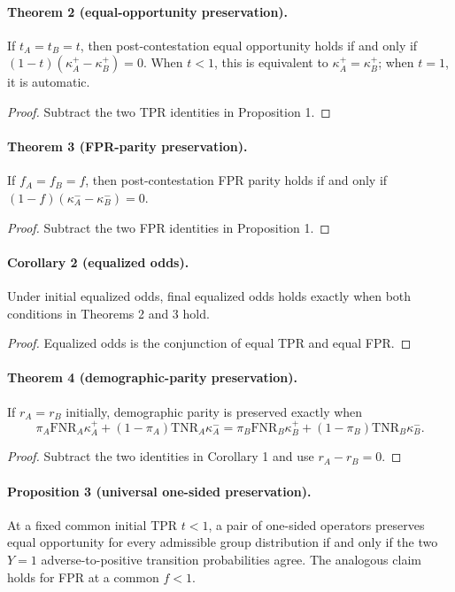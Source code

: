 \paragraph{Theorem 2 (equal-opportunity preservation).}
If $t_A=t_B=t$, then post-contestation equal opportunity holds if and only if
$(1-t)(\kappa_A^+-\kappa_B^+)=0$.  When $t<1$, this is equivalent to
$\kappa_A^+=\kappa_B^+$; when $t=1$, it is automatic.

\begin{proof}
Subtract the two TPR identities in Proposition 1.
\end{proof}

\paragraph{Theorem 3 (FPR-parity preservation).}
If $f_A=f_B=f$, then post-contestation FPR parity holds if and only if
$(1-f)(\kappa_A^--\kappa_B^-)=0$.

\begin{proof}
Subtract the two FPR identities in Proposition 1.
\end{proof}

\paragraph{Corollary 2 (equalized odds).}
Under initial equalized odds, final equalized odds holds exactly when both
conditions in Theorems 2 and 3 hold.

\begin{proof}
Equalized odds is the conjunction of equal TPR and equal FPR.
\end{proof}

\paragraph{Theorem 4 (demographic-parity preservation).}
If $r_A=r_B$ initially, demographic parity is preserved exactly when
\[
\pi_A\mathrm{FNR}_A\kappa_A^+
 +(1-\pi_A)\mathrm{TNR}_A\kappa_A^-
=\pi_B\mathrm{FNR}_B\kappa_B^+
 +(1-\pi_B)\mathrm{TNR}_B\kappa_B^-.
\]

\begin{proof}
Subtract the two identities in Corollary 1 and use $r_A-r_B=0$.
\end{proof}

\paragraph{Proposition 3 (universal one-sided preservation).}
At a fixed common initial TPR $t<1$, a pair of one-sided operators preserves
equal opportunity for every admissible group distribution if and only if the
two $Y=1$ adverse-to-positive transition probabilities agree.  The analogous
claim holds for FPR at a common $f<1$.

